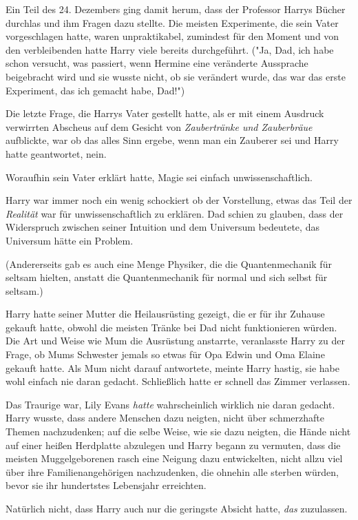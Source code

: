 {Ein Teil des 24. Dezembers ging damit herum, dass der Professor Harrys Bücher durchlas und ihm Fragen dazu stellte. Die meisten Experimente, die sein Vater vorgeschlagen hatte, waren unpraktikabel, zumindest für den Moment und von den verbleibenden hatte Harry viele bereits durchgeführt. ("Ja, Dad, ich habe schon versucht, was passiert, wenn Hermine eine veränderte Aussprache beigebracht wird und sie wusste nicht, ob sie verändert wurde, das war das erste Experiment, das ich gemacht habe, Dad!")

Die letzte Frage, die Harrys Vater gestellt hatte, als er mit einem Ausdruck verwirrten Abscheus auf dem Gesicht von \emph{Zaubertränke und Zauberbräue} aufblickte, war ob das alles Sinn ergebe, wenn man ein Zauberer sei und Harry hatte geantwortet, nein.

Woraufhin sein Vater erklärt hatte, Magie sei einfach unwissenschaftlich.

Harry war immer noch ein wenig schockiert ob der Vorstellung, etwas das Teil der \emph{Realität} war für unwissenschaftlich zu erklären. Dad schien zu glauben, dass der Widerspruch zwischen seiner Intuition und dem Universum bedeutete, das Universum hätte ein Problem.

(Andererseits gab es auch eine Menge Physiker, die die Quantenmechanik für seltsam hielten, anstatt die Quantenmechanik für normal und sich selbst für seltsam.)

Harry hatte seiner Mutter die Heilausrüsting gezeigt, die er für ihr Zuhause gekauft hatte, obwohl die meisten Tränke bei Dad nicht funktionieren würden. Die Art und Weise wie Mum die Ausrüstung anstarrte, veranlasste Harry zu der Frage, ob Mums Schwester jemals so etwas für Opa Edwin und Oma Elaine gekauft hatte. Als Mum nicht darauf antwortete, meinte Harry hastig, sie habe wohl einfach nie daran gedacht. Schließlich hatte er schnell das Zimmer verlassen.

Das Traurige war, Lily Evans \emph{hatte} wahrscheinlich wirklich nie daran gedacht. Harry wusste, dass andere Menschen dazu neigten, nicht über schmerzhafte Themen nachzudenken; auf die selbe Weise, wie sie dazu neigten, die Hände nicht auf einer heißen Herdplatte abzulegen und Harry begann zu vermuten, dass die meisten Muggelgeborenen rasch eine Neigung dazu entwickelten, nicht allzu viel über ihre Familienangehörigen nachzudenken, die ohnehin alle sterben würden, bevor sie ihr hundertstes Lebensjahr erreichten.

Natürlich nicht, dass Harry auch nur die geringste Absicht hatte, \emph{das} zuzulassen.

}

